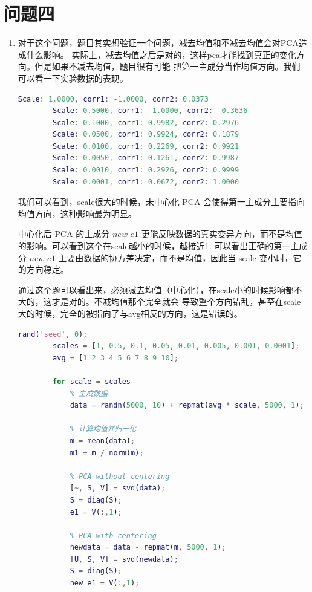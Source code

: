 \documentclass[answers]{exam}  %
\begin{document}
\section{问题四}
\begin{enumerate}[label=\alph*.] 
    \item 对于这个问题，题目其实想验证一个问题，减去均值和不减去均值会对PCA造成什么影响。
    实际上，减去均值之后是对的，这样pca才能找到真正的变化方向。但是如果不减去均值，题目很有可能
    把第一主成分当作均值方向。我们可以看一下实验数据的表现。
    \begin{lstlisting}[language=matlab]
        Scale: 1.0000, corr1: -1.0000, corr2: 0.0373
        Scale: 0.5000, corr1: -1.0000, corr2: -0.3636
        Scale: 0.1000, corr1: 0.9982, corr2: 0.2976
        Scale: 0.0500, corr1: 0.9924, corr2: 0.1879
        Scale: 0.0100, corr1: 0.2269, corr2: 0.9921
        Scale: 0.0050, corr1: 0.1261, corr2: 0.9987
        Scale: 0.0010, corr1: 0.2926, corr2: 0.9999
        Scale: 0.0001, corr1: 0.0672, corr2: 1.0000
    \end{lstlisting}
    我们可以看到，scale很大的时候，未中心化 PCA 会使得第一主成分主要指向均值方向，这种影响最为明显。

    中心化后 PCA 的主成分 $new\_e1$ 更能反映数据的真实变异方向，而不是均值的影响。可以看到这个在scale越小的时候，越接近1.
    可以看出正确的第一主成分 $new\_e1$ 主要由数据的协方差决定，而不是均值，因此当 scale 变小时，它的方向稳定。

    通过这个题可以看出来，必须减去均值（中心化），在scale小的时候影响都不大的，这才是对的。不减均值那个完全就会
    导致整个方向错乱，甚至在scale大的时候，完全的被指向了与avg相反的方向，这是错误的。
    \begin{lstlisting}[language=matlab]
        rand('seed', 0);
        scales = [1, 0.5, 0.1, 0.05, 0.01, 0.005, 0.001, 0.0001];
        avg = [1 2 3 4 5 6 7 8 9 10];
        
        for scale = scales
            % 生成数据
            data = randn(5000, 10) + repmat(avg * scale, 5000, 1);
            
            % 计算均值并归一化
            m = mean(data);
            m1 = m / norm(m);
            
            % PCA without centering
            [~, S, V] = svd(data);
            S = diag(S);
            e1 = V(:,1);
            
            % PCA with centering
            newdata = data - repmat(m, 5000, 1);
            [U, S, V] = svd(newdata);
            S = diag(S);
            new_e1 = V(:,1);
            

\end{lstlisting}
\end{enumerate}
\end{document}
